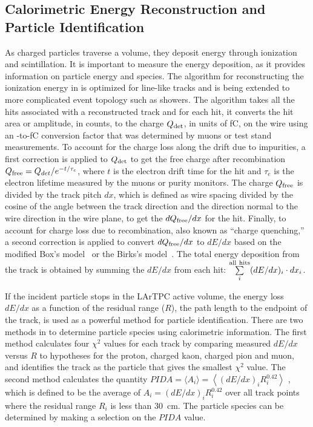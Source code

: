 \subsection{Calorimetric Energy Reconstruction and Particle Identification}

As charged particles traverse a \lar{} volume, they deposit energy through ionization and scintillation. It is important to measure the energy deposition, as it provides information on particle energy and species. The algorithm for reconstructing the ionization energy in  is optimized for line-like tracks and is being extended to more complicated event topology such as showers. The algorithm takes all the hits associated with a reconstructed track and for %
each hit, it converts the hit area or amplitude, in  counts, %
to the charge $Q_{\rm det}$, in units of \si{\femto\coulomb}, on the wire using an -to-\si{\femto\coulomb} conversion factor that was determined by muons or test stand measurements. To account for the charge loss along the drift due to impurities, a first correction is applied to $Q_{\rm det}$ to get the free charge after recombination $Q_{\rm free} = Q_{det}/e^{-t/\tau_{e}}$, where $t$ is the electron drift time for the hit and $\tau_{e}$ is the electron lifetime measured by the muons or purity monitors. The charge $Q_{\rm{free}}$ is divided by the track pitch $dx$, which is defined as wire spacing divided by the cosine of the angle between the track direction and the direction normal to the wire direction in the wire plane, to get the $dQ_{\rm{free}}/dx$ for the hit. Finally, to account for charge loss due to recombination, also known as ``charge quenching,'' a second correction is applied to convert $dQ_{\rm{free}}/dx$ to $dE/dx$ based on the modified Box's model~ \cite{Acciarri:2013met} or the Birks's model~\cite{Amoruso:2004dy}. The total energy deposition from the track is obtained by summing the $dE/dx$ from each hit: $\sum\limits_{i}^{\rm all\ hits}(dE/dx)_{i}\cdot dx_{i}$.

If the incident particle stops in the LArTPC active volume, the energy loss $dE/dx$ as a function of the residual range ($R$), the path length to the endpoint of the track, is used as a powerful method for particle identification. There are two methods in  to determine particle species using calorimetric information. The first method calculates four $\chi^{2}$ values for each track by comparing measured $dE/dx$ %
versus $R$ to hypotheses for the proton, charged kaon, charged pion and muon, and identifies the track as the particle that gives the smallest $\chi^{2}$ value. The second method calculates the quantity $PIDA = \langle A_{i}\rangle = \left\langle(dE/dx)_{i}R_{i}^{0.42}\right\rangle$ \cite{Acciarri:2013met}, which is defined to be the average of $A_{i} = (dE/dx)_{i}R_{i}^{0.42}$ over all track points where the residual range $R_{i}$ is less than \SI{30}{cm}. The particle species can be determined by making a selection on the $PIDA$ value. 


